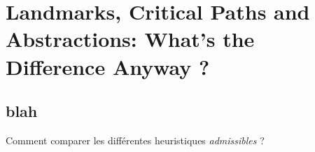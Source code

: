 \section{Landmarks, Critical Paths and Abstractions: What's the Difference Anyway ?}
  \subsection*{blah}

\begin{frame}
  \begin{block}{Comment comparer les différentes heuristiques \emph{admissibles} ?}
      
  

  \end{block}
\end{frame}

